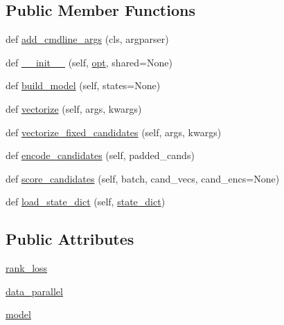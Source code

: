 \subsection*{Public Member Functions}
\begin{DoxyCompactItemize}
\item 
def \hyperlink{classparlai_1_1agents_1_1transformer_1_1polyencoder_1_1PolyencoderAgent_adbbf75b4d5b32529621ab9f6edbb904f}{add\+\_\+cmdline\+\_\+args} (cls, argparser)
\item 
def \hyperlink{classparlai_1_1agents_1_1transformer_1_1polyencoder_1_1PolyencoderAgent_a2e8f1aca19a3ba34386d7c69ed7e17bc}{\+\_\+\+\_\+init\+\_\+\+\_\+} (self, \hyperlink{classparlai_1_1core_1_1torch__agent_1_1TorchAgent_a785bb920cf8c8afc3e9bf6a8b77e335a}{opt}, shared=None)
\item 
def \hyperlink{classparlai_1_1agents_1_1transformer_1_1polyencoder_1_1PolyencoderAgent_a50c59f1b745560d8883c1f9b65dce10a}{build\+\_\+model} (self, states=None)
\item 
def \hyperlink{classparlai_1_1agents_1_1transformer_1_1polyencoder_1_1PolyencoderAgent_a02cea5573a5135f5a7201c49296abded}{vectorize} (self, args, kwargs)
\item 
def \hyperlink{classparlai_1_1agents_1_1transformer_1_1polyencoder_1_1PolyencoderAgent_ad002f52bc5bfbe8269983bbfc0988f98}{vectorize\+\_\+fixed\+\_\+candidates} (self, args, kwargs)
\item 
def \hyperlink{classparlai_1_1agents_1_1transformer_1_1polyencoder_1_1PolyencoderAgent_ae73fe8d98b46a7ef18ef7115f29c999d}{encode\+\_\+candidates} (self, padded\+\_\+cands)
\item 
def \hyperlink{classparlai_1_1agents_1_1transformer_1_1polyencoder_1_1PolyencoderAgent_ad75794f4004267ab538258bc2571235f}{score\+\_\+candidates} (self, batch, cand\+\_\+vecs, cand\+\_\+encs=None)
\item 
def \hyperlink{classparlai_1_1agents_1_1transformer_1_1polyencoder_1_1PolyencoderAgent_a4b6301664c0a7e98e9c688cc75ca79dc}{load\+\_\+state\+\_\+dict} (self, \hyperlink{classparlai_1_1core_1_1torch__agent_1_1TorchAgent_a9f89e606931a4622a5c6a6f6b832235c}{state\+\_\+dict})
\end{DoxyCompactItemize}
\subsection*{Public Attributes}
\begin{DoxyCompactItemize}
\item 
\hyperlink{classparlai_1_1agents_1_1transformer_1_1polyencoder_1_1PolyencoderAgent_a20e36e9eb037ae6f71ae661e94bb6445}{rank\+\_\+loss}
\item 
\hyperlink{classparlai_1_1agents_1_1transformer_1_1polyencoder_1_1PolyencoderAgent_a7b415240e04df392cb8767911fc0ff68}{data\+\_\+parallel}
\item 
\hyperlink{classparlai_1_1agents_1_1transformer_1_1polyencoder_1_1PolyencoderAgent_a1b3a89e114cfe44d7601a47d62c78861}{model}
\end{DoxyCompactItemize}
